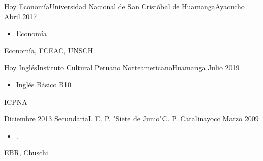 

\begin{experiences}
  \experience
  {Hoy}   {Economía}{Universidad Nacional de San Cristóbal de Huamanga}{Ayacucho}
  {Abril 2017} {
    \begin{itemize}
      \item Economía

    \end{itemize}
  }
  {Economía, FCEAC, UNSCH}

  \emptySeparator

  \experience
  {Hoy}   {Inglés}{Instituto Cultural Peruano Norteamericano}{Huamanga}
  {Julio 2019}
  {
    \begin{itemize}
      \item Inglés Básico B10

    \end{itemize}
  }
  {ICPNA}

  \emptySeparator

  \experience
  {Diciembre 2013}   {Secundaria}{I. E. P. "Siete de Junio"}{C. P. Catalinayocc}
  {Marzo 2009}
  {
    \begin{itemize}
      \item .

    \end{itemize}
  }
  {EBR, Chuschi}
\end{experiences}